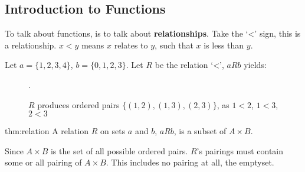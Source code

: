 \subsection{Introduction to Functions}
To talk about functions, is to talk about \textbf{relationships}. Take the `<' sign, this
is a relationship. $x < y$ means $x$ relates to $y$, such that $x$ is less than $y$.\\

\noindent
\begin{center}
    Let $a=\{1,2,3,4\}$, $b=\{0,1,2,3\}$. Let $R$ be the relation `<', $aRb$ yields:
\end{center}

\vspace{1em}
\begin{figure}[ht]
    \centering
    \caption{\centering $R$ produces ordered pairs $\{(1,2),(1,3),(2,3)\}$, as $1<2$, $1<3$, $2<3$}.
    \label{fig:relates}
\end{figure}

\begin{Def}[Relation]{thm:relation}
    A relation $R$ on sets $a$ and $b$, $aRb$, is a subset of $A\times B$.
\end{Def}

\noindent
Since $A\times B$ is the set of all possible ordered pairs. $R$'s pairings must contain some or
all pairing of $A\times B$. This includes no pairing at all, the emptyset.\\

